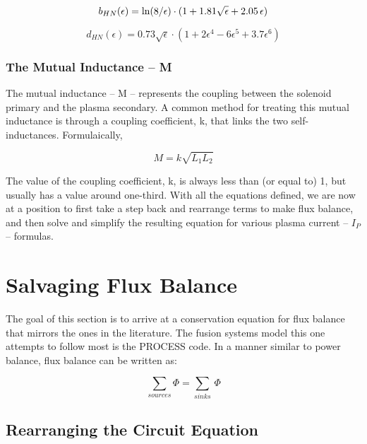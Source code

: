 \begin{equation}
	b_{HN}(\epsilon) = \textnormal{ln} (8/\epsilon) \cdot ( 1 + 1.81 \sqrt{\epsilon} + 2.05 \, \epsilon )
\end{equation}

\begin{equation}
	d_{HN}(\epsilon) = 0.73 \sqrt{\epsilon}  \cdot ( 1 + 2 \epsilon^4 - 6 \epsilon^5 +3.7 \epsilon^6 )
\end{equation}

\subsubsection{The Mutual Inductance -- M}

The mutual inductance -- M -- represents the coupling between the solenoid primary and the plasma secondary. A common method for treating this mutual inductance is through a coupling coefficient, k, that links the two self-inductances. Formulaically, 

\begin{equation}
	M = k \sqrt{ L_1 L_2 }
\end{equation}

The value of the coupling coefficient, k, is always less than (or equal to) 1, but usually has a value around one-third. With all the equations defined, we are now at a position to first take a step back and rearrange terms to make flux balance, and then solve and simplify the resulting equation for various plasma current -- $I_P$ -- formulas.

\section{Salvaging Flux Balance}

The goal of this section is to arrive at a conservation equation for flux balance that mirrors the ones in the literature. The fusion systems model this one attempts to follow most is the PROCESS code. In a manner similar to power balance, flux balance can be written as:

\begin{equation}
	\sum_{sources} \Phi = \sum_{sinks} \, \Phi
\end{equation}

\subsection{Rearranging the Circuit Equation}


